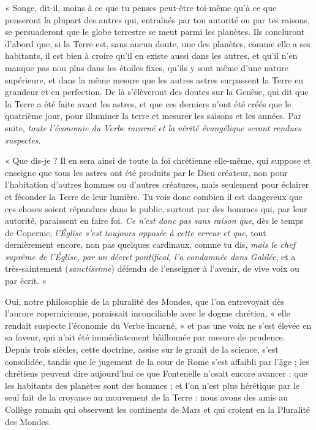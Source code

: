 \documentclass[a4paper, 11pt, oneside]{article}
\begin{document}
« Songe, dit-il, moins à ce que tu penses peut-être toi-même qu'à ce que penseront la plupart des autres qui, entraînés par ton autorité ou par tes raisons, se persuaderont que le globe terrestre se meut parmi les planètes. Ils concluront d'abord que, si la Terre est, sans aucun doute, une des planètes, comme elle a ses habitants, il est bien à croire qu'il en existe aussi dans les autres, et qu'il n'en manque pas non plus dans les étoiles fixes, qu'ils y sont même d'une nature supérieure, et dans la même mesure que les autres astres surpassent la Terre en grandeur et en perfection. De là s'élèveront des doutes sur la Genèse, qui dit que la Terre a été faite avant les astres, et que ces derniers n'ont été créés que le quatrième jour, pour illuminer la terre et mesurer les saisons et les années. Par suite, \emph{toute l'économie du Verbe incarné et la vérité évangélique seront rendues suspectes}.

« Que dis-je ? Il en sera ainsi de toute la foi chrétienne elle-même, qui suppose et enseigne que tous les astres ont été produits par le Dieu créateur, non pour l'habitation d'autres hommes ou d'autres créatures, mais seulement pour éclairer et féconder la Terre de leur lumière. Tu vois donc combien il est dangereux que ces choses soient répandues dans le public, surtout par des hommes qui, par leur autorité, paraissent en faire foi. \emph{Ce n'est donc pas sans raison que}, dès le temps de Copernic, \emph{l'Église s'est toujours opposée à cette erreur et que}, tout dernièrement encore, non pas quelques cardinaux, comme tu dis, \emph{mais le chef suprême de l'Église, par un décret pontifical, l'a condamnée dans Galilée}, et a très-saintement (\emph{sanctissime}) défendu de l'enseigner à l'avenir, de vive voix ou par écrit. »

Oui, notre philosophie de la pluralité des Mondes, que l'on entrevoyait dès l'aurore copernicienne, paraissait inconciliable avec le dogme chrétien, « elle rendait suspecte l'économie du Verbe incarné, » et pas une voix ne s'est élevée en sa faveur, qui n'ait été immédiatement bâillonnée par mesure de prudence. Depuis trois siècles, cette doctrine, assise sur le granit de la science, s'est consolidée, tandis que le jugement de la cour de Rome s'est affaibli par l'âge ; les chrétiens peuvent dire aujourd'hui ce que Fontenelle n'osait encore avancer : que les habitants des planètes sont des hommes ; et l'on n'est plus hérétique par le seul fait de la croyance au mouvement de la Terre : nous avons des amis au Collège romain qui observent les continents de Mars et qui croient en la Pluralité des Mondes.
\end{document}
